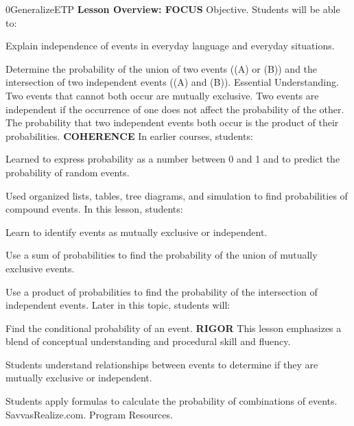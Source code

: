 \documentclass{article}
\newenvironment{te-addendum}[2]{}{}     %
\begin{document}
\begin{te-addendum}{0}{GeneralizeETP}
\textbf{Lesson Overview: FOCUS}
Objective. Students will be able to:
\item Explain independence of events in everyday language and everyday situations.
\item Determine the probability of the union of two events ((A) or (B)) and the intersection of two independent events ((A) and (B)).
Essential Understanding. Two events that cannot both occur are mutually exclusive. Two events are independent if the occurrence of one does not affect the probability of the other. The probability that two independent events both occur is the product of their probabilities.
\textbf{COHERENCE}
In earlier courses, students:
\item Learned to express probability as a number between 0 and 1 and to predict the probability of random events.
\item Used organized lists, tables, tree diagrams, and simulation to find probabilities of compound events.
In this lesson, students:
\item Learn to identify events as mutually exclusive or independent.
\item Use a sum of probabilities to find the probability of the union of mutually exclusive events.
\item Use a product of probabilities to find the probability of the intersection of independent events.
Later in this topic, students will:
\item Find the conditional probability of an event.
\textbf{RIGOR}
This lesson emphasizes a blend of conceptual understanding and procedural skill and fluency.
\item Students understand relationships between events to determine if they are mutually exclusive or independent.
\item Students apply formulas to calculate the probability of combinations of events.
SavvasRealize.com. Program Resources.
\end{te-addendum}
\end{document}
